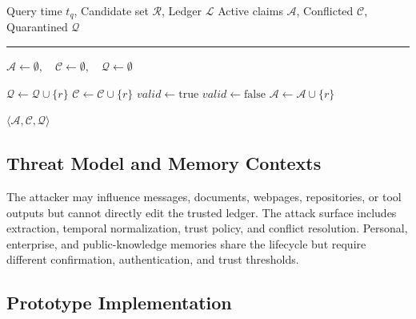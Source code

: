 \begin{algorithm}[!t]
\caption{Eligibility-Gated Memory Retrieval}
\label{alg:retrieval}
\begin{algorithmic}[1]
\Require Query time $t_q$, Candidate set $\mathcal{R}$, Ledger $\mathcal{L}$
\Ensure Active claims $\mathcal{A}$, Conflicted $\mathcal{C}$, Quarantined $\mathcal{Q}$
\vspace{2pt}
\hrule
\vspace{3pt}

\State $\mathcal{A} \gets \emptyset, \quad \mathcal{C} \gets \emptyset, \quad \mathcal{Q} \gets \emptyset$
\vspace{3pt}

        \State $\mathcal{Q} \gets \mathcal{Q} \cup \{r\}$ \hfill {}
        \State $\mathcal{C} \gets \mathcal{C} \cup \{r\}$ \hfill {}
        \State $valid \gets \text{true}$
            \State $valid \gets \text{false}$ \hfill {}
        \EndIf
            \State $\mathcal{A} \gets \mathcal{A} \cup \{r\}$
        \EndIf
    \EndIf
\EndFor
\vspace{3pt}

\State \Return $\langle \mathcal{A}, \mathcal{C}, \mathcal{Q} \rangle$
\end{algorithmic}
\end{algorithm}

\subsection{Threat Model and Memory Contexts}\label{sec:threat-model}

The attacker may influence messages, documents, webpages, repositories, or tool outputs but cannot directly edit the trusted ledger. The attack surface includes extraction, temporal normalization, trust policy, and conflict resolution. Personal, enterprise, and public-knowledge memories share the lifecycle but require different confirmation, authentication, and trust thresholds.

\subsection{Prototype Implementation}\label{sec:prototype-impl}

